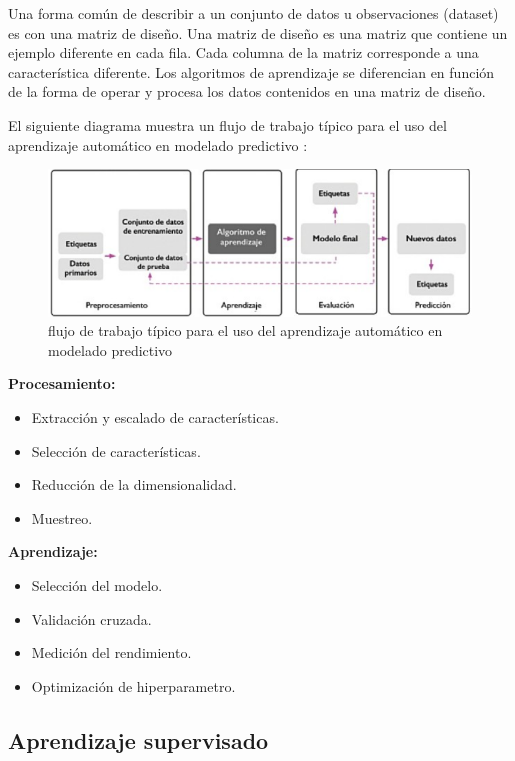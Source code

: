 Una forma común de describir a un conjunto de datos u observaciones (dataset) es con una matriz de diseño. Una matriz de diseño es una matriz que contiene un ejemplo diferente en cada fila. Cada columna de la matriz corresponde a una característica diferente. Los algoritmos de aprendizaje se diferencian en función de la forma de operar y procesa los datos contenidos en una matriz de diseño\cite{arana2021redes}.

El siguiente diagrama muestra un flujo de trabajo típico para el uso del aprendizaje automático en modelado predictivo \cite{mirjalili2020python}:

\begin{figure}[H]
  \begin{center}
    \includegraphics[scale=0.80]{./uso_aprendisaje_automatico.png}
    \caption{ flujo de trabajo típico para el uso del aprendizaje automático en modelado predictivo}
    \label{fig:perceptron}
  \end{center}
\end{figure}

\textbf{Procesamiento:}
  \begin{itemize}
    \item Extracción y escalado de características.
    \item Selección de características.
    \item Reducción de la dimensionalidad.
    \item Muestreo.
  \end{itemize}
\textbf{Aprendizaje:}%
  \begin{itemize}
    \item Selección del modelo.
    \item Validación cruzada.
    \item Medición del rendimiento.
    \item Optimización de hiperparametro.
  \end{itemize}

\subsection{Aprendizaje supervisado}

